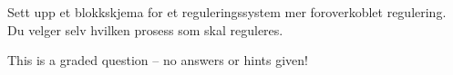 

Sett upp et blokkskjema for et reguleringssystem mer foroverkoblet regulering. Du velger selv hvilken prosess som skal reguleres. 






\vfil 

\eject






This is a graded question -- no answers or hints given!









